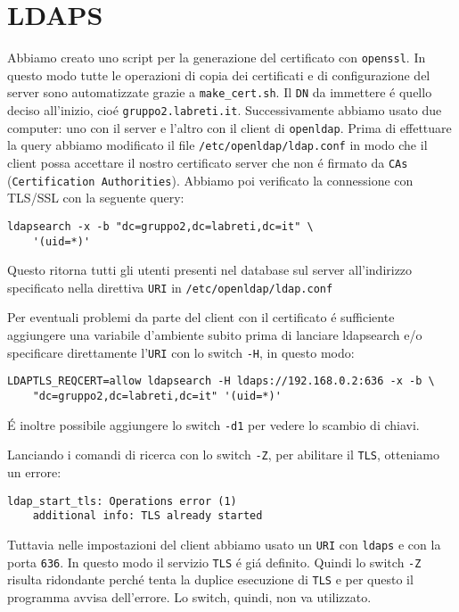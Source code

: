 \documentclass[11pt, a4paper, oneside]{article}
\begin{document}
		\section{LDAPS}
			\par
				Abbiamo creato uno script per la generazione 
				del certificato con \texttt{openssl}. In questo 
				modo tutte le operazioni di copia dei 
				certificati e di configurazione del server sono 
				automatizzate grazie a \texttt{make\_cert.sh}.
				Il \texttt{DN} da immettere \'e quello deciso 
				all'inizio, cio\'e \texttt{gruppo2.labreti.it}.
				Successivamente abbiamo usato due computer: uno 
				con il server e l'altro con il client di
				\texttt{openldap}. Prima di effettuare
				la query abbiamo modificato il file
				\texttt{/etc/openldap/ldap.conf} in modo che il 
				client possa accettare il nostro 
				certificato server che non \'e firmato da 
				\texttt{CAs} (\texttt{Certification 
				Authorities}). Abbiamo poi verificato la 
				connessione con TLS/SSL con la seguente query:
			\begin{verbatim}
ldapsearch -x -b "dc=gruppo2,dc=labreti,dc=it" \
	'(uid=*)'
			\end{verbatim}
				Questo ritorna tutti gli utenti presenti nel 
				database sul server all'indirizzo specificato 
				nella direttiva \texttt{URI} in 
				\texttt{/etc/openldap/ldap.conf}
			\par
				Per eventuali problemi da parte del client con 
				il certificato \'e sufficiente aggiungere una 
				variabile d'ambiente subito prima di lanciare 
				ldapsearch e/o specificare direttamente 
				l'\texttt{URI} con lo switch \texttt{-H}, in 
				questo modo:
				\begin{verbatim}
LDAPTLS_REQCERT=allow ldapsearch -H ldaps://192.168.0.2:636 -x -b \
	"dc=gruppo2,dc=labreti,dc=it" '(uid=*)'
				\end{verbatim}
			\par
				\'E inoltre possibile aggiungere lo switch
				\texttt{-d1} per vedere lo scambio di chiavi.
			\par
				Lanciando i comandi di ricerca con lo switch 
				\texttt{-Z}, per abilitare il \texttt{TLS}, 
				otteniamo un errore:
				\begin{verbatim}
ldap_start_tls: Operations error (1)
	additional info: TLS already started
				\end{verbatim}
				Tuttavia nelle impostazioni del client abbiamo 
				usato un \texttt{URI} con \texttt{ldaps} e con 
				la porta \texttt{636}. In questo modo il 
				servizio \texttt{TLS} \'e gi\'a definito. 
				Quindi 
				lo switch 
				\texttt{-Z} risulta ridondante perch\'e tenta 
				la duplice esecuzione di \texttt{TLS} e per 
				questo il programma avvisa dell'errore. Lo 
				switch, quindi, non va utilizzato.
			\newpage
\end{document}
